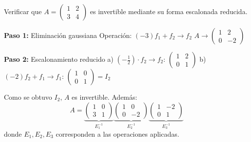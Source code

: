 \begin{example}
Verificar que $A = \begin{pmatrix} 1 & 2 \\ 3 & 4 \end{pmatrix}$ es invertible mediante su forma escalonada reducida.
\begin{myproof}
\textbf{Paso 1:} Eliminación gaussiana  
Operación: $(-3)f_1 + f_2 \to f_2$  
$A \to \begin{pmatrix} \boxed{1} & 2 \\ 0 & -2 \end{pmatrix}$

\textbf{Paso 2:} Escalonamiento reducido  
a) $\left(-\frac{1}{2}\right) \cdot f_2 \to f_2$: $\begin{pmatrix} 1 & 2 \\ 0 & 1 \end{pmatrix}$  
b) $(-2)f_2 + f_1 \to f_1$: $\begin{pmatrix} \boxed{1} & 0 \\ 0 & \boxed{1} \end{pmatrix} = I_2$

Como se obtuvo $I_2$, $A$ es invertible. Además:  
\[
A = \underbrace{\begin{pmatrix} 1 & 0 \\ 3 & 1 \end{pmatrix}}_{E_1^{-1}} \underbrace{\begin{pmatrix} 1 & 0 \\ 0 & -2 \end{pmatrix}}_{E_2^{-1}} \underbrace{\begin{pmatrix} 1 & -2 \\ 0 & 1 \end{pmatrix}}_{E_3^{-1}}
\]
donde $E_1, E_2, E_3$ corresponden a las operaciones aplicadas.
\end{myproof}
\end{example}

